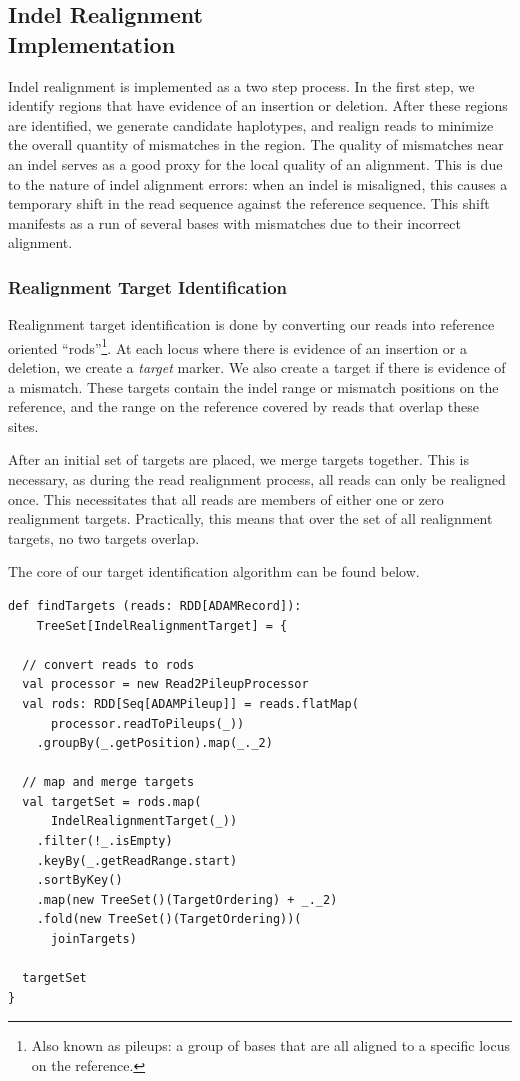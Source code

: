 \documentclass[10pt,twocolumn]{article}
\theoremstyle{plain}
\begin{document}
\subsection{Indel Realignment\\Implementation}
\label{sec:indel-realignment-implementation}

Indel realignment is implemented as a two step process. In the first step, we identify regions that have evidence of an insertion or
deletion. After these regions are identified, we generate candidate haplotypes, and realign reads to minimize the overall quantity
of mismatches in the region. The quality of mismatches near an indel serves as a good proxy for the local quality of an alignment.
This is due to the nature of indel alignment errors: when an indel is misaligned, this causes a temporary shift in the read sequence
against the reference sequence. This shift manifests as a run of several bases with mismatches due to their incorrect alignment.

\subsubsection{Realignment Target Identification}
\label{sec:realignment-target-identification}

Realignment target identification is done by converting our reads into reference oriented ``rods''\footnote{Also known as pileups: a
group of bases that are all aligned to a specific locus on the reference.}. At each locus where there is evidence of an insertion or a
deletion, we create a \emph{target} marker. We also create a target if there is evidence of a mismatch. These targets contain the indel
range or mismatch positions on the reference, and the range on the reference covered by reads that overlap these sites.

After an initial set of targets are placed, we merge targets together. This is necessary, as during the read realignment process, all
reads can only be realigned once. This necessitates that all reads are members of either one or zero realignment targets. Practically,
this means that over the set of all realignment targets, no two targets overlap.

The core of our target identification algorithm can be found below.

\begin{lstlisting}
def findTargets (reads: RDD[ADAMRecord]):
    TreeSet[IndelRealignmentTarget] = {

  // convert reads to rods
  val processor = new Read2PileupProcessor
  val rods: RDD[Seq[ADAMPileup]] = reads.flatMap(
      processor.readToPileups(_))
    .groupBy(_.getPosition).map(_._2)

  // map and merge targets
  val targetSet = rods.map(
      IndelRealignmentTarget(_))
    .filter(!_.isEmpty)
    .keyBy(_.getReadRange.start)
    .sortByKey()
    .map(new TreeSet()(TargetOrdering) + _._2)
    .fold(new TreeSet()(TargetOrdering))(
      joinTargets)

  targetSet
}
\end{lstlisting}
\end{document}
